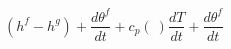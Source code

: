 \begin{equation}
(h^f-h^g) +\frac{d\theta^f }{dt} + c_p(\ ) \frac{d T}{dt} +   \frac{d\theta^f }{dt}
\end{equation}